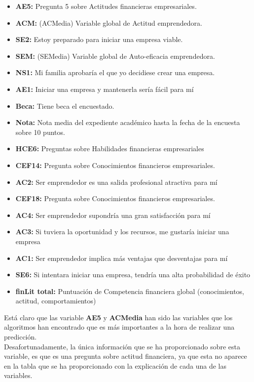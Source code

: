 \begin{itemize}
	\item \textbf{AE5:} Pregunta 5 sobre Actitudes financieras empresariales. 
	\item \textbf{ACM:} (ACMedia) Variable global de Actitud emprendedora.
	\item \textbf{SE2:} Estoy preparado para iniciar una empresa viable.
	\item \textbf{SEM:} (SEMedia) Variable global de Auto-eficacia emprendedora.
	\item \textbf{NS1:} Mi familia aprobaría el que yo decidiese crear una empresa. 
	\item \textbf{AE1:} Iniciar una empresa y mantenerla sería fácil para mí
	\item \textbf{Beca:} Tiene beca el encuestado.
	\item \textbf{Nota:} Nota media del expediente académico hasta la fecha de la encuesta sobre 10 puntos.
	\item \textbf{HCE6:} Preguntas sobre Habilidades financieras empresariales
	\item \textbf{CEF14:} Pregunta sobre Conocimientos financieros empresariales.
	\item \textbf{AC2:} Ser emprendedor es una salida profesional atractiva para mí
	\item \textbf{CEF18:} Pregunta sobre Conocimientos financieros empresariales.
	\item \textbf{AC4:} Ser emprendedor supondría una gran satisfacción para mí
	\item \textbf{AC3:} Si tuviera la oportunidad y los recursos, me gustaría iniciar una empresa
	\item \textbf{AC1:} Ser emprendedor implica más ventajas que desventajas para mí
	\item \textbf{SE6:} Si intentara iniciar una empresa, tendría una alta probabilidad de éxito
	\item \textbf{finLit total:} Puntuación de Competencia financiera global (conocimientos, actitud, comportamientos)
\end{itemize}
Está claro que las variable \textbf{AE5} y \textbf{ACMedia} han sido las variables que los algoritmos han encontrado que es más importantes a la hora de realizar una predicción.\\
Desafortunadamente, la única información que se ha proporcionado sobre esta variable, es que es una pregunta sobre actitud financiera, ya que esta no aparece en la tabla que se ha proporcionado con la explicación de cada una de las variables.\\
